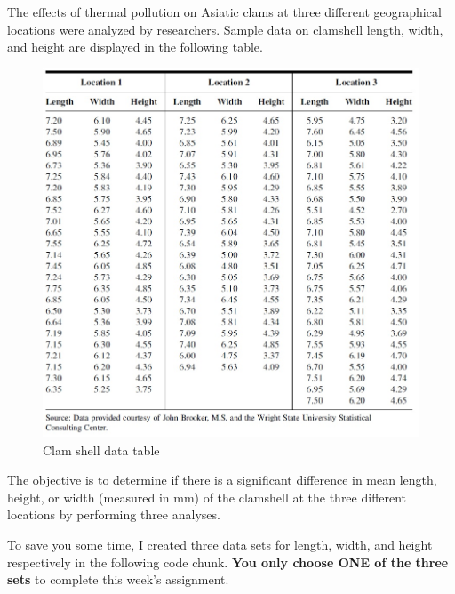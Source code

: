 \documentclass[
]{book}
\begin{document}
The effects of thermal pollution on Asiatic clams at three different geographical
locations were analyzed by researchers. Sample data on clamshell length, width, and
height are displayed in the following table.

\begin{figure}

{\centering \includegraphics[width=0.8\linewidth]{img08/w08-clamshell-data-table} 

}

\caption{Clam shell data table}\label{fig:unnamed-chunk-134}
\end{figure}

The objective is to determine if there is a significant difference in mean length, height, or width (measured in mm) of the clamshell at the three different locations by performing three analyses.

To save you some time, I created three data sets for length, width, and height respectively in the following code chunk. \textbf{You only choose ONE of the three sets} to complete this week's assignment.
\end{document}
